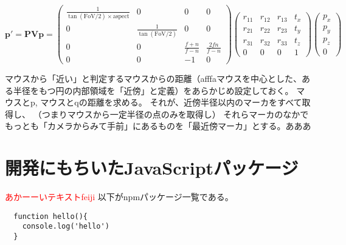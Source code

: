 $$
\bm{p'} =  
  \mathbf{P} \mathbf{V} \bm{p}
  =
  \begin{pmatrix}
    \frac{1}{\tan(\text{FoV}/2) \times \text{aspect}} & 0 & 0 & 0 \\
    0 & \frac{1}{\tan(\text{FoV}/2)} & 0 & 0 \\
    0 & 0 & \frac{f+n}{f-n} & \frac{2fn}{f-n} \\
    0 & 0 & -1 & 0
    \end{pmatrix}
    \begin{pmatrix}
      r_{11} & r_{12} & r_{13} & t_x \\
      r_{21} & r_{22} & r_{23} & t_y \\
      r_{31} & r_{32} & r_{33} & t_z \\
      0 & 0 & 0 & 1
    \end{pmatrix}    
    \begin{pmatrix}
    {p_x} \\
    {p_y} \\
    {p_z} \\
    {0}
    \end{pmatrix}
$$

マウスから「近い」と判定するマウスからの距離（afffaマウスを中心とした、ある半径をもつ円の内部領域を「近傍」と定義）をあらかじめ設定しておく。
マウスとp, マウスとqの距離を求める。
それが、近傍半径以内のマーカをすべて取得し、
（つまりマウスから一定半径の点のみを取得し）
それらマーカのなかでもっとも「カメラからみて手前」にあるものを「最近傍マーカ」とする。あああ


\section{開発にもちいたJavaScriptパッケージ}
\textcolor{red}{あかーーいテキストfeiji}
以下がnpmパッケージ一覧である。

\begin{lstlisting}
  function hello(){
    console.log('hello')
  }
\end{lstlisting}


